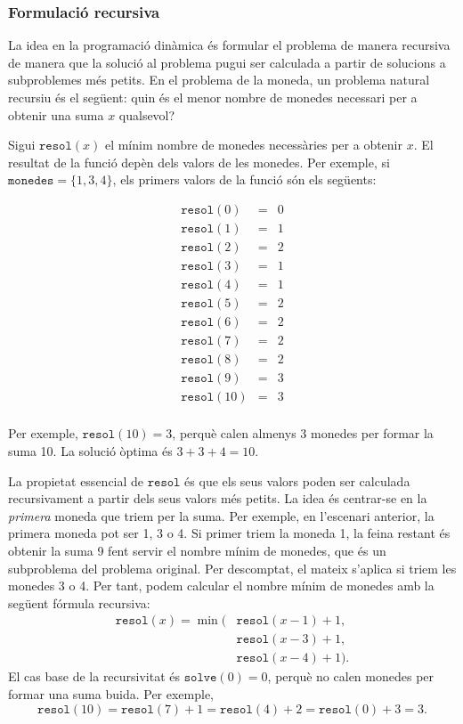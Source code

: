 \subsubsection{Formulació recursiva}

La idea en la programació dinàmica és
formular el problema de manera recursiva
de manera que la solució al problema pugui ser
calculada a partir de solucions a subproblemes més petits.
En el problema de la moneda, un problema natural
recursiu és el següent:
quin és el menor nombre de monedes
necessari per a obtenir una suma $x$ qualsevol?

Sigui $\texttt{resol}(x)$
el mínim nombre de monedes necessàries per a obtenir $x$.
El resultat de la funció depèn dels
valors de les monedes.
Per exemple, si $\texttt{monedes} = \{1,3,4\}$,
els primers valors de la funció són els següents:

\[
\begin{array}{lcl}
\texttt{resol}(0) & = & 0 \\
\texttt{resol}(1) & = & 1 \\
\texttt{resol}(2) & = & 2 \\
\texttt{resol}(3) & = & 1 \\
\texttt{resol}(4) & = & 1 \\
\texttt{resol}(5) & = & 2 \\
\texttt{resol}(6) & = & 2 \\
\texttt{resol}(7) & = & 2 \\
\texttt{resol}(8) & = & 2 \\
\texttt{resol}(9) & = & 3 \\
\texttt{resol}(10) & = & 3 \\
\end{array}
\]

Per exemple, $\texttt{resol}(10)=3$,
perquè calen almenys 3 monedes
per formar la suma 10.
La solució òptima és $3+3+4=10$.

La propietat essencial de $\texttt{resol}$ és
que els seus valors poden ser
calculada recursivament a partir dels seus valors més petits.
La idea és centrar-se en la \emph{primera}
moneda que triem per la suma.
Per exemple, en l'escenari anterior,
la primera moneda pot ser 1, 3 o 4.
Si primer triem la moneda 1,
la feina restant és obtenir la suma 9
fent servir el nombre mínim de monedes,
que és un subproblema del problema original.
Per descomptat, el mateix s'aplica si triem les monedes 3 o 4.
Per tant, podem calcular el nombre mínim de monedes
amb la següent fórmula recursiva:
\begin{equation*}
\begin{split}
\texttt{resol}(x) = \min( & \texttt{resol}(x-1)+1, \\
                           & \texttt{resol}(x-3)+1, \\
                           & \texttt{resol}(x-4)+1).
\end{split}
\end{equation*}
El cas base de la recursivitat és $\texttt{solve}(0)=0$,
perquè no calen monedes per formar una suma buida.
Per exemple,
\[ \texttt{resol}(10) = \texttt{resol}(7)+1 = \texttt{resol}(4)+2 = \texttt{resol}(0)+3 = 3.\]

